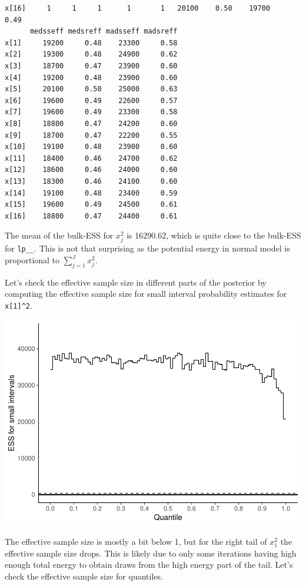 \documentclass[american,]{article}
\begin{document}
\begin{verbatim}
x[16]     1     1     1      1       1   20100    0.50    19700     0.49
      medsseff medsreff madsseff madsreff
x[1]     19200     0.48    23300     0.58
x[2]     19300     0.48    24900     0.62
x[3]     18700     0.47    23900     0.60
x[4]     19200     0.48    23900     0.60
x[5]     20100     0.50    25000     0.63
x[6]     19600     0.49    22600     0.57
x[7]     19600     0.49    23300     0.58
x[8]     18800     0.47    24200     0.60
x[9]     18700     0.47    22200     0.55
x[10]    19100     0.48    23900     0.60
x[11]    18400     0.46    24700     0.62
x[12]    18600     0.46    24000     0.60
x[13]    18300     0.46    24100     0.60
x[14]    19100     0.48    23400     0.59
x[15]    19600     0.49    24500     0.61
x[16]    18800     0.47    24400     0.61
\end{verbatim}

The mean of the bulk-ESS for \(x_j^2\) is 16290.62, which is quite close
to the bulk-ESS for \texttt{lp\_\_}. This is not that surprising as the
potential energy in normal model is proportional to
\(\sum_{j=1}^J x_j^2\).

Let's check the effective sample size in different parts of the
posterior by computing the effective sample size for small interval
probability estimates for \texttt{x{[}1{]}\^{}2}.

\includegraphics{graphics/local-ess-fit-n-2-1.pdf}

The effective sample size is mostly a bit below 1, but for the right
tail of \(x_1^2\) the effective sample size drops. This is likely due to
only some iterations having high enough total energy to obtain draws
from the high energy part of the tail. Let's check the effective sample
size for quantiles.
\end{document}
